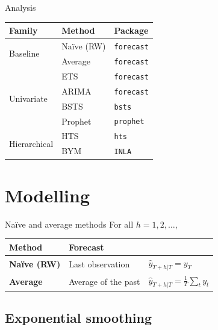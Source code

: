 \documentclass[12pt,aspectratio=169]{beamer}
\begin{document}
\begin{frame}{Analysis}
    \centering%
    \begin{tabular}{lll}
        \toprule
        \textbf{Family}               & \textbf{Method} & \textbf{Package} \\
        \midrule
        \multirow{2}{*}{Baseline}     & Naïve (RW)      & \texttt{forecast} \\
                                      & Average         & \texttt{forecast} \\
        \midrule
        \multirow{4}{*}{Univariate}   & ETS             & \texttt{forecast} \\
                                      & ARIMA           & \texttt{forecast} \\
                                      & BSTS            & \texttt{bsts} \\
                                      & Prophet         & \texttt{prophet} \\
        \midrule
        \multirow{2}{*}{Hierarchical} & HTS             & \texttt{hts} \\
                                      & BYM             & \texttt{INLA} \\
        \bottomrule
    \end{tabular}
\end{frame}

\section{Modelling}

\begin{frame}{Naïve and average methods}
    For all $h = 1, 2, \ldots$,
    \begin{center}
        \renewcommand{\arraystretch}{1.5}%
        \begin{tabular}{lll}
            \toprule
            \textbf{Method}     & \textbf{Forecast} & \\
            \midrule
            \textbf{Naïve (RW)} & Last observation & $\hat{y}_{T + h | T} = y_{T}$ \\
            \textbf{Average}    & Average of the past & $\hat{y}_{T + h | T} = \frac{1}{T} \sum_{t} y_{t}$ \\
            \bottomrule
        \end{tabular}
    \end{center}
\end{frame}

\subsection{Exponential smoothing}
\end{document}
